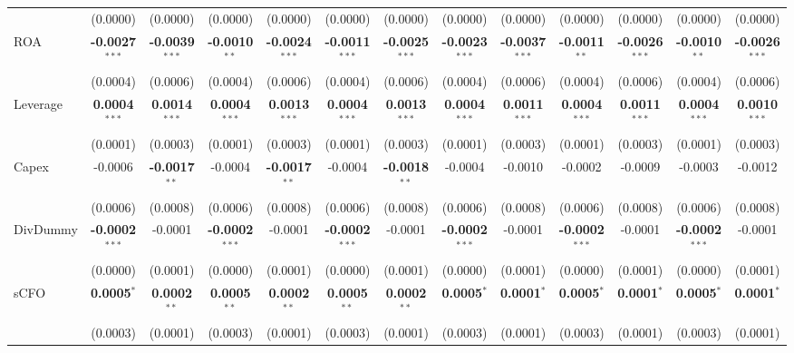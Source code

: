 \begin{landscape}
\begin{table}[H]
\begin{tabular}{lcccccccccccc}
 & (0.0000) & (0.0000) & (0.0000) & (0.0000) & (0.0000) & (0.0000) & (0.0000) & (0.0000) & (0.0000) & (0.0000) & (0.0000) & (0.0000) \\
ROA & \textbf{-0.0027}$^{***}$ & \textbf{-0.0039}$^{***}$ & \textbf{-0.0010}$^{**}$ & \textbf{-0.0024}$^{***}$ & \textbf{-0.0011}$^{***}$ & \textbf{-0.0025}$^{***}$ & \textbf{-0.0023}$^{***}$ & \textbf{-0.0037}$^{***}$ & \textbf{-0.0011}$^{**}$ & \textbf{-0.0026}$^{***}$ & \textbf{-0.0010}$^{**}$ & \textbf{-0.0026}$^{***}$ \\
 & (0.0004) & (0.0006) & (0.0004) & (0.0006) & (0.0004) & (0.0006) & (0.0004) & (0.0006) & (0.0004) & (0.0006) & (0.0004) & (0.0006) \\
Leverage & \textbf{0.0004}$^{***}$ & \textbf{0.0014}$^{***}$ & \textbf{0.0004}$^{***}$ & \textbf{0.0013}$^{***}$ & \textbf{0.0004}$^{***}$ & \textbf{0.0013}$^{***}$ & \textbf{0.0004}$^{***}$ & \textbf{0.0011}$^{***}$ & \textbf{0.0004}$^{***}$ & \textbf{0.0011}$^{***}$ & \textbf{0.0004}$^{***}$ & \textbf{0.0010}$^{***}$ \\
 & (0.0001) & (0.0003) & (0.0001) & (0.0003) & (0.0001) & (0.0003) & (0.0001) & (0.0003) & (0.0001) & (0.0003) & (0.0001) & (0.0003) \\
Capex & -0.0006 & \textbf{-0.0017}$^{**}$ & -0.0004 & \textbf{-0.0017}$^{**}$ & -0.0004 & \textbf{-0.0018}$^{**}$ & -0.0004 & -0.0010 & -0.0002 & -0.0009 & -0.0003 & -0.0012 \\
 & (0.0006) & (0.0008) & (0.0006) & (0.0008) & (0.0006) & (0.0008) & (0.0006) & (0.0008) & (0.0006) & (0.0008) & (0.0006) & (0.0008) \\
DivDummy & \textbf{-0.0002}$^{***}$ & -0.0001 & \textbf{-0.0002}$^{***}$ & -0.0001 & \textbf{-0.0002}$^{***}$ & -0.0001 & \textbf{-0.0002}$^{***}$ & -0.0001 & \textbf{-0.0002}$^{***}$ & -0.0001 & \textbf{-0.0002}$^{***}$ & -0.0001 \\
 & (0.0000) & (0.0001) & (0.0000) & (0.0001) & (0.0000) & (0.0001) & (0.0000) & (0.0001) & (0.0000) & (0.0001) & (0.0000) & (0.0001) \\
sCFO & \textbf{0.0005}$^{*}$ & \textbf{0.0002}$^{**}$ & \textbf{0.0005}$^{**}$ & \textbf{0.0002}$^{**}$ & \textbf{0.0005}$^{**}$ & \textbf{0.0002}$^{**}$ & \textbf{0.0005}$^{*}$ & \textbf{0.0001}$^{*}$ & \textbf{0.0005}$^{*}$ & \textbf{0.0001}$^{*}$ & \textbf{0.0005}$^{*}$ & \textbf{0.0001}$^{*}$ \\
 & (0.0003) & (0.0001) & (0.0003) & (0.0001) & (0.0003) & (0.0001) & (0.0003) & (0.0001) & (0.0003) & (0.0001) & (0.0003) & (0.0001) \\

\end{tabular}
\end{table}
\end{landscape}
